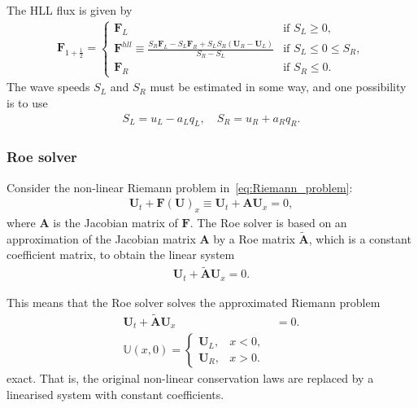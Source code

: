 The HLL flux is given by
\begin{align*}
    \mathbf{F}_{1 + \frac{1}{2}} = \begin{cases}
        \mathbf{F}_L & \text{if } S_L \geq 0, \\
        \mathbf{F}^{hll} \equiv \frac{S_R \mathbf{F}_L - S_L \mathbf{F}_R + S_L S_R (\mathbf{U}_R - \mathbf{U}_L)}{S_R - S_L} & \text{if } S_L \leq 0 \leq S_R, \\
        \mathbf{F}_R & \text{if } S_R \leq 0.
    \end{cases}
\end{align*}
The wave speeds $S_L$ and $S_R$ must be estimated in some way, and one possibility is to use 
\begin{align*}
    S_L = u_L - a_L q_L, \quad S_R = u_R + a_R q_R.
\end{align*}

\subsubsection{Roe solver}
Consider the non-linear Riemann problem in~\eqref{eq:Riemann_problem}:
\begin{align*}
    \mathbf{U}_t + \mathbf{F(U)}_x \equiv \mathbf{U}_t + \mathbf{A} \mathbf{U}_x = 0,
\end{align*}
where $\mathbf{A}$ is the Jacobian matrix of $\mathbf{F}$. 
The Roe solver is based on an approximation of the Jacobian matrix $\mathbf{A}$ by a Roe matrix $\tilde{\mathbf{A}}$, which is a constant coefficient matrix, to obtain the linear system
\begin{align*}
    \mathbf{U}_t + \mathbf{\tilde{A}} \mathbf{U}_x = 0.
\end{align*}

This means that the Roe solver solves the approximated Riemann problem
\begin{align*}
    \mathbf{U}_t + \mathbf{\tilde{A}} \mathbf{U}_x &= 0. \\
    \mathbb{U}(x,0) = \begin{cases}
        \mathbf{U}_L, & x < 0, \\
        \mathbf{U}_R, & x > 0.
    \end{cases}
\end{align*}
exact.
That is, the original non-linear conservation laws are replaced by a linearised system with constant coefficients.

